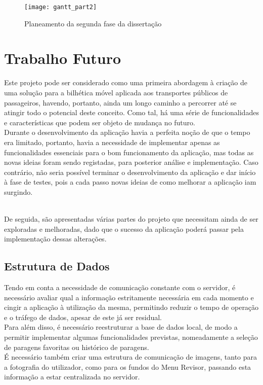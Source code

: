 \begin{figure}[t]
  \begin{center}
    \leavevmode
    \texttt{[image: gantt\_part2]}
    \caption{Planeamento da segunda fase da dissertação}
    \label{fig:gantt2}
  \end{center}
\end{figure}

\section{Trabalho Futuro}

Este projeto pode ser considerado como uma primeira abordagem à criação de uma solução para a bilhética móvel aplicada aos transportes públicos de passageiros, havendo, portanto, ainda um longo caminho a percorrer até se atingir todo o potencial deste conceito. Como tal, há uma série de funcionalidades e características que podem ser objeto de mudança no futuro.
\\Durante o desenvolvimento da aplicação havia a perfeita noção de que o tempo era limitado, portanto, havia a necessidade de implementar apenas as funcionalidades essenciais para o bom funcionamento da aplicação, mas todas as novas ideias foram sendo registadas, para posterior análise e implementação. Caso contrário, não seria possível terminar o desenvolvimento da aplicação e dar início à fase de testes, pois a cada passo novas ideias de como melhorar a aplicação iam surgindo.

~\\De seguida, são apresentadas várias partes do projeto que necessitam ainda de ser exploradas e melhoradas, dado que o sucesso da aplicação poderá passar pela implementação dessas alterações.

\subsection{Estrutura de Dados}

Tendo em conta a necessidade de comunicação constante com o servidor, é necessário avaliar qual a informação estritamente necessária em cada momento e cingir a aplicação à utilização da mesma, permitindo reduzir o tempo de operação e o tráfego de dados, apesar de este já ser residual.
\\Para além disso, é necessário reestruturar a base de dados local, de modo a permitir implementar algumas funcionalidades previstas, nomeadamente a seleção de paragens favoritas ou histórico de paragens.
\\É necessário também criar uma estrutura de comunicação de imagens, tanto para a fotografia do utilizador, como para os fundos do Menu Revisor, passando esta informação a estar centralizada no servidor.

